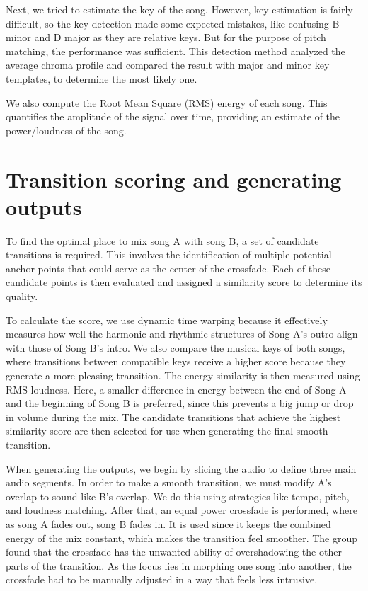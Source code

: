 \documentclass[14pt]{extarticle}
\begin{document}
Next, we tried to estimate the key of the song. However, key estimation is fairly difficult, so the key detection made some expected mistakes, like confusing B minor and D major as they are relative keys. But for the purpose of pitch matching, the performance was sufficient. This detection method analyzed the average chroma profile and compared the result with major and minor key templates, to determine the most likely one.

We also compute the Root Mean Square (RMS) energy of each song. This quantifies the amplitude of the signal over time, providing an estimate of the power/loudness of the song. 


\section{Transition scoring and generating outputs}

To find the optimal place to mix song A with song B, a set of candidate transitions is required. This involves the identification of multiple potential anchor points that could serve as the center of the crossfade. Each of these candidate points is then evaluated and assigned a similarity score to determine its quality. 

To calculate the score, we use dynamic time warping because it effectively measures how well the harmonic and rhythmic structures of Song A's outro align with those of Song B's intro. We also compare the musical keys of both songs, where transitions between compatible keys receive a higher score because they generate a more pleasing transition. The energy similarity is then measured using RMS loudness. Here, a smaller difference in energy between the end of Song A and the beginning of Song B is preferred, since this prevents a big jump or drop in volume during the mix. The candidate transitions that achieve the highest similarity score are then selected for use when generating the final smooth transition.

When generating the outputs, we begin by slicing the audio to define three main audio segments. In order to make a smooth transition, we must modify A's overlap to sound like B's overlap. We do this using strategies like tempo, pitch, and loudness matching. After that, an equal power crossfade is performed, where as song A fades out, song B fades in. It is used since it keeps the combined energy of the mix constant, which makes the transition feel smoother. The group found that the crossfade has the unwanted ability of overshadowing the other parts of the transition. As the focus lies in morphing one song into another, the crossfade had to be manually adjusted in a way that feels less intrusive.
\end{document}
